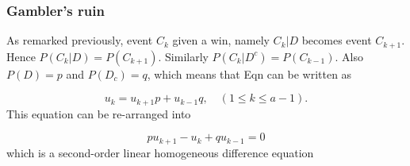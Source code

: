 \documentclass[spanish]{beamer}
\begin{document}
\begin{frame}
\frametitle{Gambler’s ruin}
As remarked previously, event $C_{k}$ given a win, namely $C_{k} \vert D$ becomes event $C_{k+1}$. Hence $P(C_{k} \vert D) = P(C_{k+1} )$. Similarly $P(C_{k} \vert D^{c} ) = P(C_{k-1} )$. Also $P(D) = p$ and $P(D_{c}) = q$, which means that Eqn can be written as

\begin{equation*}
u_{k} = u_{k+1} p + u_{k-1} q, \quad (1 \leq k \leq a -1).
\end{equation*}
This equation can be re-arranged into

\begin{equation*}
 p u_{k+1} -u_{k}+ qu_{k-1} = 0
\end{equation*}
which is a second-order linear homogeneous difference equation

\end{frame}
\end{document}
